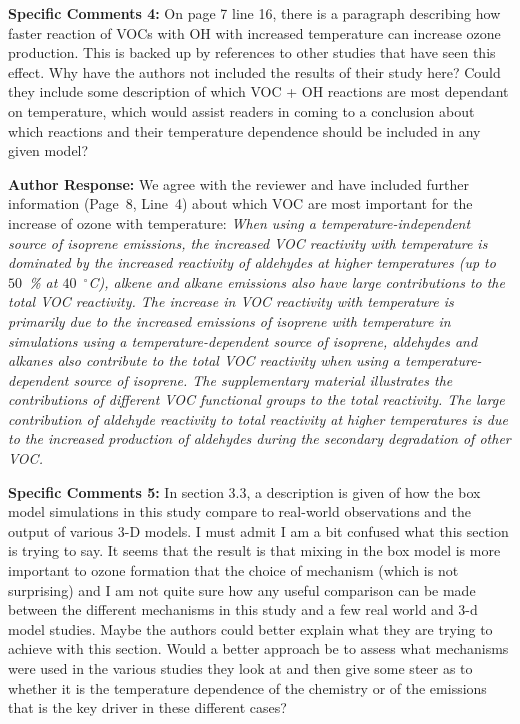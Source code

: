 \documentclass{article}
\DeclareRobustCommand*\degree{\ensuremath{^{\circ}}}
\begin{document}
\textbf{Specific Comments 4:} On page 7 line 16, there is a paragraph describing how faster reaction of VOCs with OH with increased temperature can increase ozone production. This is backed up by references to other studies that have seen this effect. Why have the authors not included the results of their study here? Could they include some description of which VOC + OH reactions are most dependant on temperature, which would assist readers in coming to a conclusion about which reactions and their temperature dependence should be included in any given model?

\textbf{Author Response:} We agree with the reviewer and have included further information (Page~8, Line~4) about which VOC are most important for the increase of ozone with temperature:
\textit{
When using a temperature-independent source of isoprene emissions, the increased VOC reactivity with temperature is dominated by the increased reactivity of aldehydes at higher temperatures (up to $50$~\% at $40$~\degree C), alkene and alkane emissions also have large contributions to the total VOC reactivity.
The increase in VOC reactivity with temperature is primarily due to the increased emissions of isoprene with temperature in simulations using a temperature-dependent source of isoprene, aldehydes and alkanes also contribute to the total VOC reactivity when using a temperature-dependent source of isoprene.
The supplementary material illustrates the contributions of different VOC functional groups to the total reactivity.
The large contribution of aldehyde reactivity to total reactivity at higher temperatures is due to the increased production of aldehydes during the secondary degradation of other VOC. 
}

\textbf{Specific Comments 5:} In section 3.3, a description is given of how the box model simulations in this study compare to real-world observations and the output of various 3-D models. I must admit I am a bit confused what this section is trying to say. It seems that the result is that mixing in the box model is more important to ozone formation that the choice of mechanism (which is not surprising) and I am not quite sure how any useful comparison can be made between the different mechanisms in this study and a few real world and 3-d model studies. Maybe the authors could better explain what they are trying to achieve with this section. Would a better approach be to assess what mechanisms were used in the various studies they look at and then give some steer as to whether it is the temperature dependence of the chemistry or of the emissions that is the key driver in these different cases?
\end{document}
